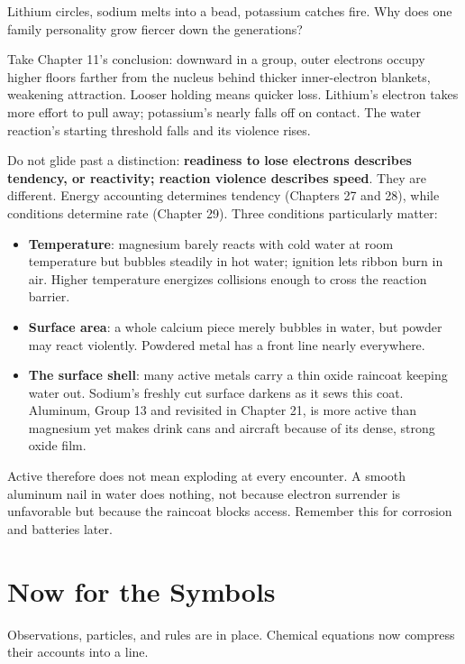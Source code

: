 Lithium circles, sodium melts into a bead, potassium catches fire. Why does one family personality grow fiercer down the generations?

Take Chapter 11's conclusion: downward in a group, outer electrons occupy higher floors farther from the nucleus behind thicker inner-electron blankets, weakening attraction. Looser holding means quicker loss. Lithium's electron takes more effort to pull away; potassium's nearly falls off on contact. The water reaction's starting threshold falls and its violence rises.

Do not glide past a distinction: \textbf{readiness to lose electrons describes tendency, or reactivity; reaction violence describes speed}. They are different. Energy accounting determines tendency (Chapters 27 and 28), while conditions determine rate (Chapter 29). Three conditions particularly matter:

\begin{itemize}[itemsep=2pt]
\item \textbf{Temperature}: magnesium barely reacts with cold water at room temperature but bubbles steadily in hot water; ignition lets ribbon burn in air. Higher temperature energizes collisions enough to cross the reaction barrier.
\item \textbf{Surface area}: a whole calcium piece merely bubbles in water, but powder may react violently. Powdered metal has a front line nearly everywhere.
\item \textbf{The surface shell}: many active metals carry a thin oxide raincoat keeping water out. Sodium's freshly cut surface darkens as it sews this coat. Aluminum, Group 13 and revisited in Chapter 21, is more active than magnesium yet makes drink cans and aircraft because of its dense, strong oxide film.
\end{itemize}

Active therefore does not mean exploding at every encounter. A smooth aluminum nail in water does nothing, not because electron surrender is unfavorable but because the raincoat blocks access. Remember this for corrosion and batteries later.

\section{Now for the Symbols}

Observations, particles, and rules are in place. Chemical equations now compress their accounts into a line.

